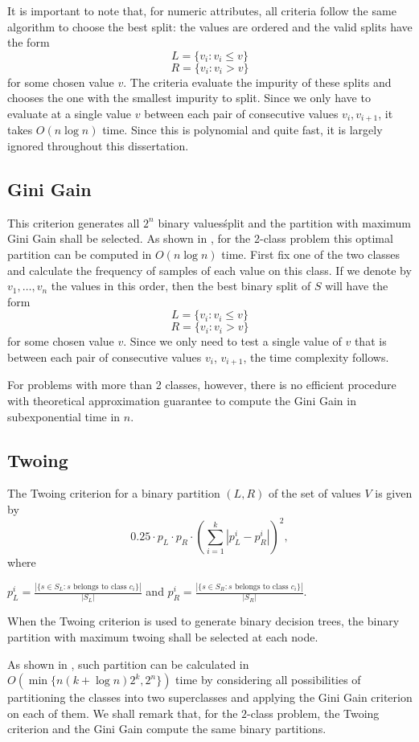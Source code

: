 It is important to note that, for numeric attributes, all criteria follow the same algorithm to choose the best split: the values are ordered and the valid splits have the form 
$$L = \{v_i : v_i \leq v\}$$
$$R = \{v_i : v_i > v\}$$
for some chosen value $v$. The criteria evaluate the impurity of these splits and chooses the one with the smallest impurity to split. Since we only have to evaluate at a single value $v$ between each pair of consecutive values $v_i, v_{i+1}$, it takes $O(n \log n)$ time. Since this is polynomial and quite fast, it is largely ignored throughout this dissertation.

\subsection{Gini Gain}
This criterion generates all $2^n$ binary values\' split and the partition with maximum Gini Gain shall be selected.
As shown in \cite{Breiman84}, for the 2-class problem this optimal partition  
can be computed  in $O(n \log n)$ time. First fix one of the two classes and calculate the frequency of samples of each value on this class.
If we denote by $v_1,\ldots,v_n$ the values in this order, then the best binary split of $S$ will have the form 
$$L = \{v_i : v_i \leq v\}$$
$$R = \{v_i : v_i > v\}$$
for some chosen value $v$. Since we only need to test a single value of $v$ that is between each pair of consecutive values $v_i$, $v_{i+1}$, the time complexity follows.

For problems with more than 2 classes, however, there is no efficient procedure with theoretical approximation guarantee to compute the Gini Gain in subexponential time in $n$.

\subsection{Twoing}
The Twoing criterion
for a  binary partition $(L,R)$ 
of the set of values $V$ is given by
$$ 0.25 \cdot p_L \cdot p_R  \cdot \left ( \sum_{i=1}^k | p_L^i - p_R^i | \right )^2, $$
where

$ p_L^i= \frac{|\{s \in S_L: s \mbox{ belongs to class } c_i \}|}{ |S_L|} $
 and 
$ p_R^i= \frac{|\{s \in S_R: s \mbox{ belongs to class } c_i\} |}{ |S_R|} $.

When the Twoing criterion is used to generate binary decision trees, the binary partition with maximum twoing shall be selected at each node. 

As shown in \cite{Breiman84}, such partition can be calculated in $O(\min \{ n (k + \log n) 2^k, 2^n \} )$
time by considering all possibilities of partitioning the classes into two superclasses
and applying the Gini Gain criterion on each of them. We shall remark that, for the $2$-class problem, the Twoing criterion and the Gini Gain compute the same binary partitions.

